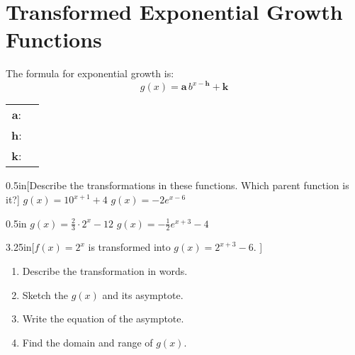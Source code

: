 \section{Transformed Exponential Growth Functions}

\begin{myCenteredBox}[width=6in]
    The formula for  exponential growth is:
    {
    \large
    \[
        g(x) = {\boldsymbol a}\, b^{x-{\boldsymbol h}} + {\boldsymbol k}
    \]
    }
    \begin{center}
        \renewcommand{\arraystretch}{1.5}
        \begin{tabular}{cl}
            $\boldsymbol a$: & \underline{\hspace{3in}} \\
            $\boldsymbol h$: & \underline{\hspace{3in}} \\ 
            $\boldsymbol k$: & \underline{\hspace{3in}} \\
        \end{tabular}
    \end{center}
\end{myCenteredBox}

\begin{my2Problems}{0.5in}[Describe the transformations in these functions. Which parent function is it?]
    {
        $g(x) = 10^{x+1} + 4$
    }
    {
        $g(x) = -2 e^{x-6} $
    }
\end{my2Problems}
\begin{my2Problems}{0.5in}
    {
        $g(x) = \frac{2}{3} \cdot 2^{x} - 12$
    }
    {
        $g(x) = -\frac{1}{2} e^{x+3}  - 4$
    }
\end{my2Problems}




\begin{myWideProblem}{3.25in}[$f(x) = 2^x$ is transformed into $g(x)=2^{x+3} - 6$. ]
    {
        \small
        \begin{minipage}{0.54\textwidth}
            \begin{enumerate}[nosep]
                \item Describe the transformation in words.
                \item Sketch the $g(x)$ and its asymptote.
            \end{enumerate}
        \end{minipage}
        \hfil
        \begin{minipage}{0.45\textwidth}
            \begin{enumerate}[nosep]
                \setcounter{enumi}{2}
                \item Write the equation of the asymptote.
                \item Find the domain and range of $g(x)$.
            \end{enumerate}
        \end{minipage}
    }
\end{myWideProblem}


